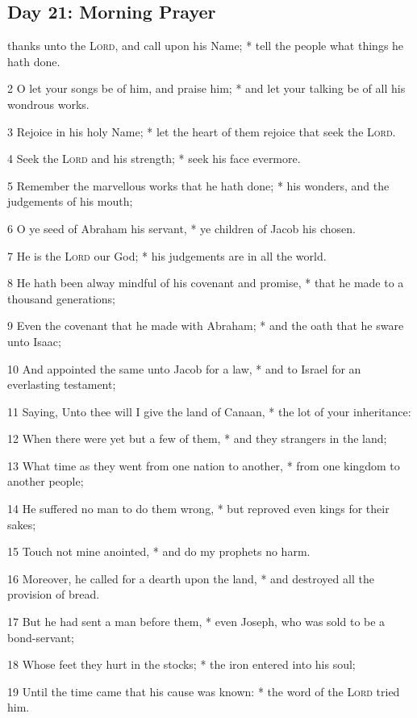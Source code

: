 \subsection{Day 21: Morning Prayer}
 thanks unto the {\textsc{Lord}}, and call upon his Name; * tell the people what things he hath done.\par
2 O let your songs be of him, and praise him; * and let your talking be of all his wondrous works.\par
3 Rejoice in his holy Name; * let the heart of them rejoice that seek the {\textsc{Lord}}.\par
4 Seek the {\textsc{Lord}} and his strength; * seek his face evermore.\par
5 Remember the marvellous works that he hath done; * his wonders, and the judgements of his mouth;\par
6 O ye seed of Abraham his servant, * ye children of Jacob his chosen.\par
7 He is the {\textsc{Lord}} our God; * his judgements are in all the world.\par
8 He hath been alway mindful of his covenant and promise, * that he made to a thousand generations;\par
9 Even the covenant that he made with Abraham; * and the oath that he sware unto Isaac;\par
10 And appointed the same unto Jacob for a law, * and to Israel for an everlasting testament;\par
11 Saying, Unto thee will I give the land of Canaan, * the lot of your inheritance:\par
12 When there were yet but a few of them, * and they strangers in the land;\par
13 What time as they went from one nation to another, * from one kingdom to another people;\par
14 He suffered no man to do them wrong, * but reproved even kings for their sakes;\par
15 Touch not mine anointed, * and do my prophets no harm.\par
16 Moreover, he called for a dearth upon the land, * and destroyed all the provision of bread.\par
17 But he had sent a man before them, * even Joseph, who was sold to be a bond-servant;\par
18 Whose feet they hurt in the stocks; * the iron entered into his soul;\par
19 Until the time came that his cause was known: * the word of the {\textsc{Lord}} tried him.\par
